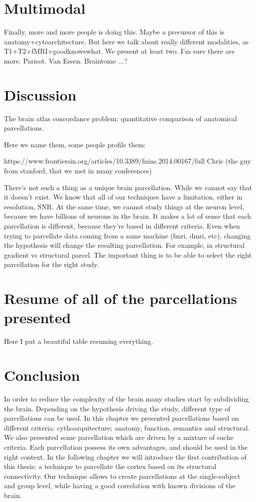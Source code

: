 \section{Multimodal}
Finally, more and more people is doing this. Maybe a precursor of this is
anatomy+cytoarchitecture. But here we talk about really different modalities,
as T1+T2+fMRI+goodknowswhat. We present at least two. I'm sure there are more.
Parisot.
Van Essen.
Braintome\cite{Fan2016}
...?

\section{Discussion}
The brain atlas concordance problem: quantitative comparison of anatomical parcellations.

Here we name them, some people profile them:

https://www.frontiersin.org/articles/10.3389/fnins.2014.00167/full %
Chris (the guy from stanford, that we met in many conferences) 

There's not such a thing as a unique brain parcellation. While we cannot say
that it doesn't exist. We know that all of our techniques have a limitation,
either in resolution, SNR. At the same time, we cannot study things at the
neuron level, because we have billions of neurons in the brain. It makes a
lot of sense that each parcellation is different, because they're based
in different criteria. Even when trying to parcellate data coming from a
same machine (fmri, dmri, etc), changing the hypothesis will change the 
resulting parcellation. For example, in structural gradient vs structural
parcel. The important thing is to be able to select the right parcellation
for the right study.

\section{Resume of all of the parcellations presented}
Here I put a beautiful table resuming everything.

\section{Conclusion}
In order to reduce the complexity of the brain many studies start by subdividing
the brain. Depending on the hypothesis driving the study, different type
of parcellations can be used. In this chapter we presented parcellations based
on different criteria: cythoarquitecture; anatomy, function, semantics and
structural. We also presented some parcellation which are driven by a mixture
of suche criteria. Each parcellation possess its own advantages, and should be
used in the right context. In the following chapter we will introduce the
first contribution of this thesis: a technique to parcellate the cortex based
on its structural connectivity. Our technique allows to create parcellations
at the single-subject and group level, while having a good correlation with
known divisions of the brain.


\chapterbib
